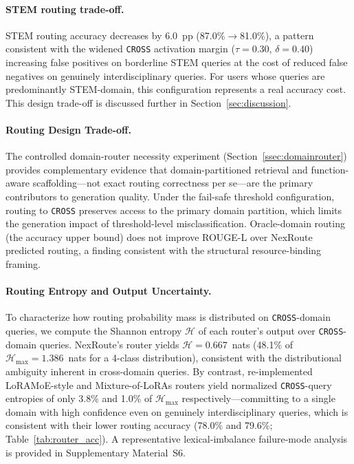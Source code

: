 \documentclass[a4paper,fleql,doubleblind]{cas-sc}
\begin{document}
\paragraph{STEM routing trade-off.}
STEM routing accuracy decreases by 6.0~pp (87.0\%$\to$81.0\%), a pattern
consistent with the widened \texttt{CROSS} activation margin ($\tau{=}0.30$,
$\delta{=}0.40$) increasing false positives on borderline STEM queries at
the cost of reduced false negatives on genuinely interdisciplinary queries.
For users whose queries are predominantly STEM-domain, this configuration
represents a real accuracy cost. This design trade-off is discussed further in
Section~\ref{sec:discussion}.

\paragraph{Routing Design Trade-off.}
The controlled domain-router necessity experiment (Section~\ref{ssec:domainrouter})
provides complementary evidence that domain-partitioned retrieval and
function-aware scaffolding---not exact routing correctness per se---are the
primary contributors to generation quality.
Under the fail-safe threshold configuration, routing to \texttt{CROSS}
preserves access to the primary domain partition, which limits the generation
impact of threshold-level misclassification.
Oracle-domain routing (the accuracy upper bound) does not improve ROUGE-L
over NexRoute predicted routing, a finding consistent with the structural
resource-binding framing.

\paragraph{Routing Entropy and Output Uncertainty.}
To characterize how routing probability mass is distributed on \texttt{CROSS}-domain queries,
we compute the Shannon entropy $\mathcal{H}$ of each router's output over
\texttt{CROSS}-domain queries. NexRoute's router yields $\mathcal{H}{=}0.667$~nats
(48.1\% of $\mathcal{H}_{\max}{=}1.386$~nats for a 4-class distribution), consistent
with the distributional ambiguity inherent in cross-domain queries. By contrast, re-implemented LoRAMoE-style
and Mixture-of-LoRAs routers yield normalized \texttt{CROSS}-query entropies
of only 3.8\% and 1.0\% of $\mathcal{H}_{\max}$ respectively---committing to a single
domain with high confidence even on genuinely interdisciplinary queries, which
is consistent with their lower routing accuracy (78.0\% and 79.6\%;
Table~\ref{tab:router_acc}). A representative lexical-imbalance failure-mode analysis
is provided in Supplementary Material~S6.
\end{document}

